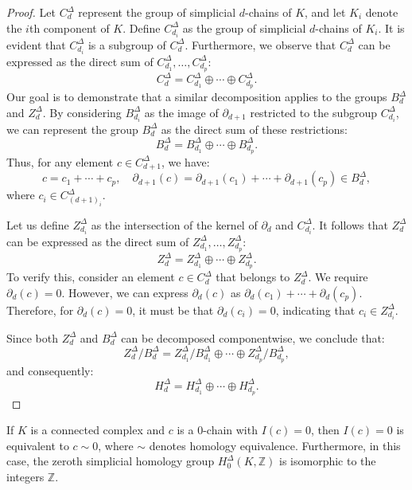 \begin{proof}
    Let $C^\Delta_d$ represent the group of simplicial $d$-chains of $K$, and let $K_i$ denote the $i$th component of $K$. Define $C^\Delta_{d_i}$ as the group of simplicial $d$-chains of $K_i$. It is evident that $C^\Delta_{d_i}$ is a subgroup of $C^\Delta_d$. Furthermore, we observe that $C^\Delta_d$ can be expressed as the direct sum of $C^\Delta_{d_1}, \ldots, C^\Delta_{d_p}$:
    \[
        C^\Delta_d = C^\Delta_{d_1} \oplus \cdots \oplus C^\Delta_{d_p}.
    \]
    Our goal is to demonstrate that a similar decomposition applies to the groups $B^\Delta_d$ and $Z^\Delta_d$. By considering $B^\Delta_{d_i}$ as the image of $\partial_{d+1}$ restricted to the subgroup $C^\Delta_{d_i}$, we can represent the group $B^\Delta_d$ as the direct sum of these restrictions:
    \[
        B^\Delta_d = B^\Delta_{d_1} \oplus \cdots \oplus B^\Delta_{d_p}.
    \]
    Thus, for any element $c \in C^\Delta_{d+1}$, we have:
    \[
        c = c_1 + \cdots + c_p, \quad \partial_{d+1}(c) = \partial_{d+1}(c_1) + \cdots + \partial_{d+1}(c_p) \in B^\Delta_d,
    \]
    where $c_i \in C^\Delta_{(d+1)_i}$.

    Let us define $Z^\Delta_{d_i}$ as the intersection of the kernel of $\partial_d$ and $C^\Delta_{d_i}$. It follows that $Z^\Delta_d$ can be expressed as the direct sum of $Z^\Delta_{d_1}, \ldots, Z^\Delta_{d_p}$:
    \[
        Z^\Delta_d = Z^\Delta_{d_1} \oplus \cdots \oplus Z^\Delta_{d_p}.
    \]
    To verify this, consider an element $c \in C^\Delta_d$ that belongs to $Z^\Delta_d$. We require $\partial_d(c) = 0$. However, we can express $\partial_d(c)$ as $\partial_d(c_1) + \cdots + \partial_d(c_p)$. Therefore, for $\partial_d(c) = 0$, it must be that $\partial_d(c_i) = 0$, indicating that $c_i \in Z^\Delta_{d_i}$.

    Since both $Z^\Delta_d$ and $B^\Delta_d$ can be decomposed componentwise, we conclude that:
    \[
        Z^\Delta_d / B^\Delta_d = Z^\Delta_{d_1} / B^\Delta_{d_1} \oplus \cdots \oplus Z^\Delta_{d_p} / B^\Delta_{d_p},
    \]
    and consequently:
    \[
        H^\Delta_d = H^\Delta_{d_1} \oplus \cdots \oplus H^\Delta_{d_p}.
    \]
\end{proof}

\begin{proposition}
    \label{decomposition}
    If $K$ is a connected complex and $c$ is a $0$-chain with $I(c) = 0$, then $I(c) = 0$ is equivalent to $c \sim 0$, where $\sim$ denotes homology equivalence. Furthermore, in this case, the zeroth simplicial homology group $H^\Delta_0(K, \mathbb{Z})$ is isomorphic to the integers $\mathbb{Z}$.
\end{proposition}

